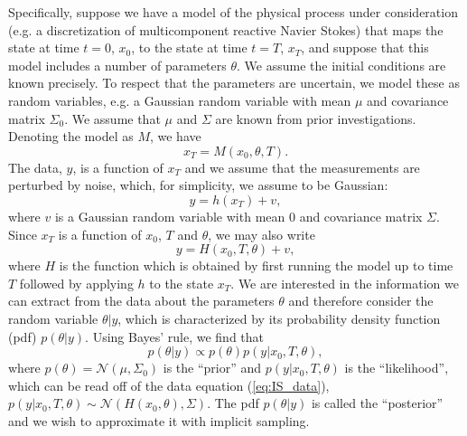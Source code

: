 \documentclass[11pt]{article}
\begin{document}
Specifically, suppose we have  a  model of the physical process under consideration (e.g. a discretization of multicomponent reactive Navier Stokes) that maps the state at time $t=0$, $x_0$, to the state at time $t=T$, $x_T$, and suppose that this model includes a number of parameters $\theta$. We assume the initial conditions are known precisely. To respect that the parameters are uncertain, we model these as random variables, e.g. a Gaussian random variable with mean $\mu$ and covariance matrix $\Sigma_0$. We assume that $\mu$ and $\Sigma$ are known from prior investigations. Denoting the model as $M$, we have
\begin{equation}
	x_T = M(x_0,\theta, T).
\end{equation}
The data, $y$, is a function of $x_T$ and we assume that the measurements are perturbed by noise, which, for simplicity, we assume to be Gaussian:
\begin{equation}
	y = h(x_T)+v,
\end{equation}
where $v$ is a Gaussian random variable with mean $0$ and covariance matrix $\Sigma$. Since $x_T$ is a function of $x_0$, $T$ and $\theta$, we may also write
\begin{equation}
\label{eq:IS_data}
	y = H(x_0,T,\theta)+v,
\end{equation}
where $H$ is the function which is obtained by first running the model up to time $T$ followed by applying $h$ to the state $x_T$.  We are interested in the information we can extract from the data about the parameters $\theta$ and therefore consider the random variable $\theta|y$, which is characterized by its probability density function (pdf) $p(\theta|y)$. Using Bayes' rule, we find that
\begin{equation}
	p(\theta|y) \propto p(\theta)p(y|x_0,T,\theta),
\end{equation}
where  $p(\theta) = \mathcal{N}(\mu,\Sigma_0)$ is the ``prior'' and $p(y|x_0,T,\theta)$ is the ``likelihood'', which can be read off of the data equation (\ref{eq:IS_data}), $p(y|x_0,T,\theta)\sim \mathcal{N}(H(x_0,\theta),\Sigma)$.
The pdf $p(\theta|y)$  is called the ``posterior'' and we wish to approximate it with implicit sampling. 
\end{document}
